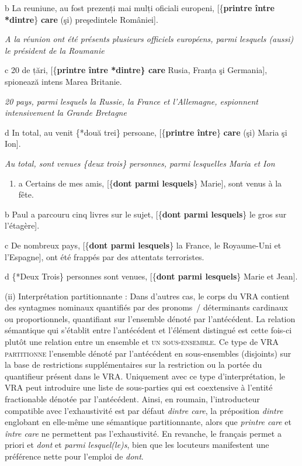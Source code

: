   b  La reuniune, au fost prezenți mai mulți oficiali europeni, [\{\textbf{printre {\textbar} între {\textbar} *dintre}\}\textbf{ care} (şi) preşedintele României].

{\itshape
A la réunion ont été présents plusieurs officiels européens, parmi lesquels (aussi) le président de la Roumanie}

  c  20 de țări, [\{\textbf{printre {\textbar} între {\textbar} *dintre\} care} Rusia, Franța şi Germania], spionează intens Marea Britanie.

{\itshape
20 pays, parmi lesquels la Russie, la France et l'Allemagne, espionnent intensivement la Grande Bretagne}

  d  In total, au venit \{*două {\textbar} trei\} persoane, [\{\textbf{printre {\textbar} între}\}\textbf{ care} (şi) Maria şi Ion].

    \textit{Au total, sont venues \{deux {\textbar} trois\} personnes, parmi lesquelles Maria et Ion} 


\begin{enumerate}
\item \label{bkm:Ref295148292}a  Certains de mes amis, [\{\textbf{dont {\textbar} parmi lesquels}\} Marie], sont venus à la fête. 


\end{enumerate}
  b  Paul a parcouru cinq livres sur le sujet, [\{\textbf{dont {\textbar} parmi lesquels}\} le gros sur l'étagère].

  c  De nombreux pays, [\{\textbf{dont {\textbar} parmi lesquels}\} la France, le Royaume-Uni et l'Espagne], ont été frappés par des attentats terroristes.

  d  \{*Deux {\textbar} Trois\} personnes sont venues, [\{\textbf{dont {\textbar} parmi lesquels}\}\textbf{} Marie et Jean].

(ii) Interprétation partitionnante : Dans d'autres cas, le corps du VRA contient des syntagmes nominaux quantifiés par des pronoms~/ déterminants cardinaux ou proportionnels, quantifiant sur l'ensemble dénoté par l'antécédent. La relation sémantique qui s'établit entre l'antécédent et l'élément distingué est cette fois-ci plutôt une relation entre un ensemble et \textsc{un sous-ensemble}. Ce type de VRA \textsc{partitionne} l'ensemble dénoté par l'antécédent en sous-ensembles (disjoints) sur la base de restrictions supplémentaires sur la restriction ou la portée du quantifieur présent dans le VRA. Uniquement avec ce type d'interprétation, le VRA peut introduire une liste de sous-parties qui est coextensive à l'entité fractionable dénotée par l'antécédent. Ainsi, en roumain, l'introducteur compatible avec l'exhaustivité est par défaut \textit{dintre care}, la préposition \textit{dintre} englobant en elle-même une sémantique partitionnante, alors que \textit{printre care} et \textit{între care} ne permettent pas l'exhaustivité. En revanche, le français permet a  priori et \textit{dont} et \textit{parmi lesquel(le)s}, bien que les locuteurs manifestent une préférence nette pour l'emploi de \textit{dont}.  


